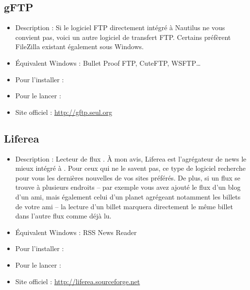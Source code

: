 \subsection{gFTP}
\begin{itemize}
\begingroup
{}
\item Description : Si le logiciel FTP directement intégré à Nautilus ne vous convient pas, voici un autre logiciel de transfert FTP. Certains préfèrent FileZilla existant également sous Windows.{\par}
\item Équivalent Windows : Bullet Proof FTP, CuteFTP, WSFTP\ldots{}{\par}
\item Pour l'installer : 
\item Pour le lancer : 
\item Site officiel : \url{http://gftp.seul.org}{\par}
\endgroup
\end{itemize}
\subsection{Liferea}
\label{RefInstallLiferea}
\begin{itemize}
\begingroup
{}
\item Description : Lecteur de flux . À mon avis, Liferea est l'agrégateur de news le mieux intégré à . Pour ceux qui ne le savent pas, ce type de logiciel recherche pour vous les dernières nouvelles de vos sites préférés. De plus, si un flux se trouve à plusieurs endroits -- par exemple vous avez ajouté le flux d'un blog d'un ami, mais également celui d'un planet agrégeant notamment les billets de votre ami -- la lecture d'un billet marquera directement le même billet dans l'autre flux comme déjà lu.{\par}
\item Équivalent Windows : RSS News Reader{\par}
\item Pour l'installer : 
\item Pour le lancer : 
\item Site officiel : \url{http://liferea.sourceforge.net}{\par}
\endgroup
\end{itemize}

